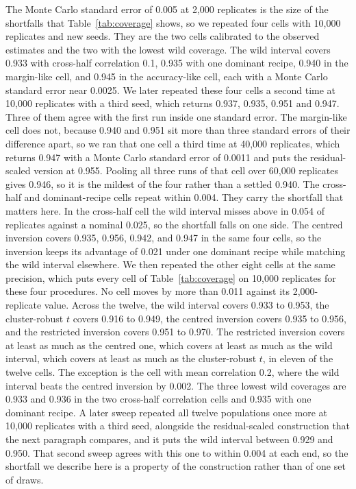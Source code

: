 The Monte Carlo standard error of 0.005 at 2,000 replicates is the size of the shortfalls that Table~\ref{tab:coverage} shows, so we repeated four cells with 10,000 replicates and new seeds. They are the two cells calibrated to the observed estimates and the two with the lowest wild coverage. The wild interval covers 0.933 with cross-half correlation 0.1, 0.935 with one dominant recipe, 0.940 in the margin-like cell, and 0.945 in the accuracy-like cell, each with a Monte Carlo standard error near 0.0025. We later repeated these four cells a second time at 10,000 replicates with a third seed, which returns 0.937, 0.935, 0.951 and 0.947. Three of them agree with the first run inside one standard error. The margin-like cell does not, because 0.940 and 0.951 sit more than three standard errors of their difference apart, so we ran that one cell a third time at 40,000 replicates, which returns 0.947 with a Monte Carlo standard error of 0.0011 and puts the residual-scaled version at 0.955. Pooling all three runs of that cell over 60,000 replicates gives 0.946, so it is the mildest of the four rather than a settled 0.940. The cross-half and dominant-recipe cells repeat within 0.004. They carry the shortfall that matters here. In the cross-half cell the wild interval misses above in 0.054 of replicates against a nominal 0.025, so the shortfall falls on one side. The centred inversion covers 0.935, 0.956, 0.942, and 0.947 in the same four cells, so the inversion keeps its advantage of 0.021 under one dominant recipe while matching the wild interval elsewhere. We then repeated the other eight cells at the same precision, which puts every cell of Table~\ref{tab:coverage} on 10,000 replicates for these four procedures. No cell moves by more than 0.011 against its 2,000-replicate value. Across the twelve, the wild interval covers 0.933 to 0.953, the cluster-robust $t$ covers 0.916 to 0.949, the centred inversion covers 0.935 to 0.956, and the restricted inversion covers 0.951 to 0.970. The restricted inversion covers at least as much as the centred one, which covers at least as much as the wild interval, which covers at least as much as the cluster-robust $t$, in eleven of the twelve cells. The exception is the cell with mean correlation 0.2, where the wild interval beats the centred inversion by 0.002. The three lowest wild coverages are 0.933 and 0.936 in the two cross-half correlation cells and 0.935 with one dominant recipe. A later sweep repeated all twelve populations once more at 10,000 replicates with a third seed, alongside the residual-scaled construction that the next paragraph compares, and it puts the wild interval between 0.929 and 0.950. That second sweep agrees with this one to within 0.004 at each end, so the shortfall we describe here is a property of the construction rather than of one set of draws.

